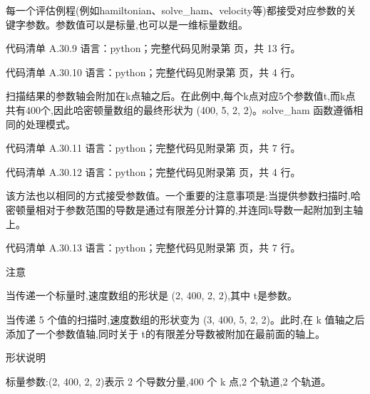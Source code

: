 \documentclass[lang=cn,scheme=chinese,color=blue,device=normal,toc=onecol,math=cm]{elegantbook}
\begin{document}
每一个评估例程(例如hamiltonian、solve\_\allowbreak{}ham、velocity等)都接受对应参数的关键字参数。参数值可以是标量,也可以是一维标量数组。\par


\begin{codeindexbox}{代码清单 A.30.9}
语言：python；完整代码见附录第 \pageref{code:30:9} 页，共 13 行。
\end{codeindexbox}


\begin{codeindexbox}{代码清单 A.30.10}
语言：python；完整代码见附录第 \pageref{code:30:10} 页，共 4 行。
\end{codeindexbox}


扫描结果的参数轴会附加在k点轴之后。在此例中,每个k点对应5个参数值t,而k点共有400个,因此哈密顿量数组的最终形状为 (400, 5, 2, 2)。solve\_\allowbreak{}ham 函数遵循相同的处理模式。\par


\begin{codeindexbox}{代码清单 A.30.11}
语言：python；完整代码见附录第 \pageref{code:30:11} 页，共 7 行。
\end{codeindexbox}


\begin{codeindexbox}{代码清单 A.30.12}
语言：python；完整代码见附录第 \pageref{code:30:12} 页，共 4 行。
\end{codeindexbox}


该方法也以相同的方式接受参数值。一个重要的注意事项是:当提供参数扫描时,哈密顿量相对于参数范围的导数是通过有限差分计算的,并连同k导数一起附加到主轴上。\par


\begin{codeindexbox}{代码清单 A.30.13}
语言：python；完整代码见附录第 \pageref{code:30:13} 页，共 7 行。
\end{codeindexbox}


注意\par


当传递一个标量时,速度数组的形状是 (2, 400, 2, 2),其中 t是参数。\par


当传递 5 个值的扫描时,速度数组的形状变为 (3, 400, 5, 2, 2)。此时,在 k 值轴之后添加了一个参数值轴,同时关于 t的有限差分导数被附加在最前面的轴上。\par


形状说明\par


标量参数:(2, 400, 2, 2)表示 2 个导数分量,400 个 k 点,2 个轨道,2 个轨道。\par
\end{document}

